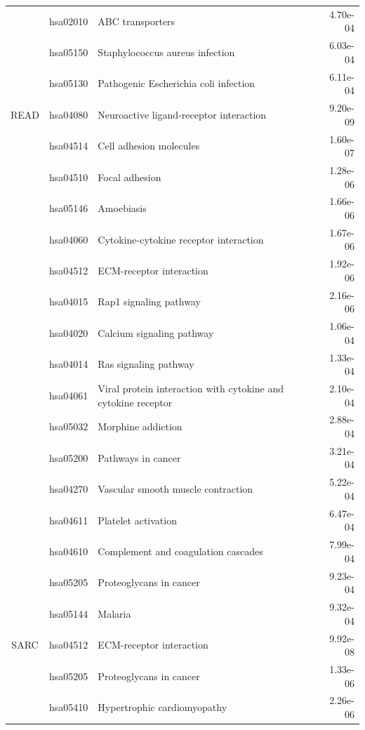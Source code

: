 \begin{longtable}{cllr}
 & hsa02010 & \textcolor{\clrnew}{ABC transporters} & 4.70e-04 \\ 
 & hsa05150 & \textcolor{\clrnew}{Staphylococcus aureus infection} & 6.03e-04 \\ 
 & hsa05130 & \textcolor{\clrnew}{Pathogenic Escherichia coli infection} & 6.11e-04 \\ 
\midrule 
READ & hsa04080 & \textcolor{\clrnew}{Neuroactive ligand-receptor interaction} & 9.20e-09\\ 
 & hsa04514 & \textcolor{\clrnew}{Cell adhesion molecules} & 1.60e-07 \\ 
 & hsa04510 & \textcolor{\clrnew}{Focal adhesion} & 1.28e-06 \\ 
 & hsa05146 & \textcolor{\clrnew}{Amoebiasis} & 1.66e-06 \\ 
 & hsa04060 & \textcolor{\clrnew}{Cytokine-cytokine receptor interaction} & 1.67e-06 \\ 
 & hsa04512 & \textcolor{\clrnew}{ECM-receptor interaction} & 1.92e-06 \\ 
 & hsa04015 & \textcolor{\clrnew}{Rap1 signaling pathway} & 2.16e-06 \\ 
 & hsa04020 & \textcolor{\clrnew}{Calcium signaling pathway} & 1.06e-04 \\ 
 & hsa04014 & \textcolor{\clrnew}{Ras signaling pathway} & 1.33e-04 \\ 
 & hsa04061 & \textcolor{\clrnew}{Viral protein interaction with cytokine and cytokine receptor} & 2.10e-04 \\ 
 & hsa05032 & \textcolor{\clrnew}{Morphine addiction} & 2.88e-04 \\ 
 & hsa05200 & \textcolor{\clrnew}{Pathways in cancer} & 3.21e-04 \\ 
 & hsa04270 & \textcolor{\clrnew}{Vascular smooth muscle contraction} & 5.22e-04 \\ 
 & hsa04611 & \textcolor{\clrnew}{Platelet activation} & 6.47e-04 \\ 
 & hsa04610 & \textcolor{\clrnew}{Complement and coagulation cascades} & 7.99e-04 \\ 
 & hsa05205 & \textcolor{\clrnew}{Proteoglycans in cancer} & 9.23e-04 \\ 
 & hsa05144 & \textcolor{\clrnew}{Malaria} & 9.32e-04 \\ 
\midrule 
\rowcolor{\clrmatch}SARC & hsa04512 & ECM-receptor interaction & 9.92e-08\\ 
 & hsa05205 & \textcolor{\clrnew}{Proteoglycans in cancer} & 1.33e-06 \\ 
 & hsa05410 & \textcolor{\clrnew}{Hypertrophic cardiomyopathy} & 2.26e-06 \\ 

\end{longtable}
